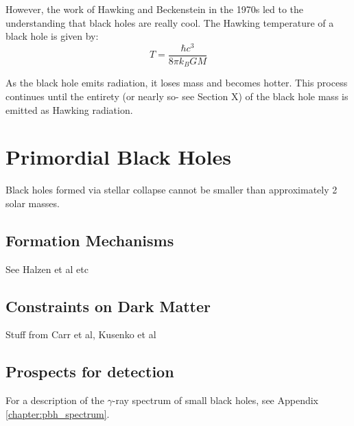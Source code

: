 However, the work of Hawking and Beckenstein in the 1970s led to the understanding that black holes are really cool.
The Hawking temperature of a black hole is given by:
\begin{equation}
T = \frac{\hbar c^3}{8\pi k_B GM}
\end{equation}

As the black hole emits radiation, it loses mass and becomes hotter.
This process continues until the entirety (or nearly so- see Section X) of the black hole mass is emitted as Hawking radiation.

\section{Primordial Black Holes}
Black holes formed via stellar collapse cannot be smaller than approximately 2 solar masses.
\subsection{Formation Mechanisms}
See Halzen et al etc
\subsection{Constraints on Dark Matter}
Stuff from Carr et al, Kusenko et al

\subsection{Prospects for detection}
For a description of the $\gamma$-ray spectrum of small black holes, see Appendix \ref{chapter:pbh_spectrum}.